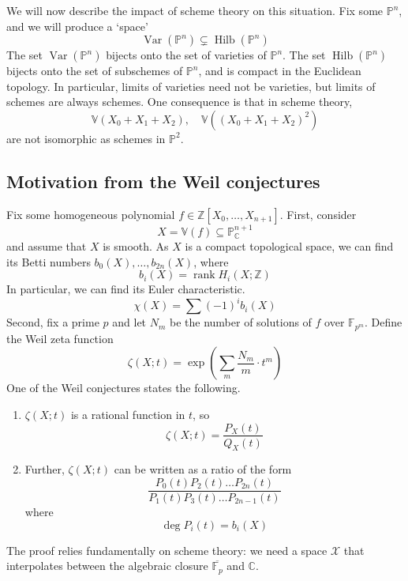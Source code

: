 We will now describe the impact of scheme theory on this situation.
Fix some \( \mathbb P^n \), and we will produce a `space'
\[ \operatorname{Var}(\mathbb P^n) \subsetneq \operatorname{Hilb}(\mathbb P^n) \]
The set \( \operatorname{Var}(\mathbb P^n) \) bijects onto the set of varieties of \( \mathbb P^n \).
The set \( \operatorname{Hilb}(\mathbb P^n) \) bijects onto the set of subschemes of \( \mathbb P^n \), and is compact in the Euclidean topology.
In particular, limits of varieties need not be varieties, but limits of schemes are always schemes.
One consequence is that in scheme theory,
\[ \mathbb V(X_0 + X_1 + X_2),\quad \mathbb V((X_0 + X_1 + X_2)^2) \]
are not isomorphic as schemes in \( \mathbb P^2 \).

\subsection{Motivation from the Weil conjectures}
Fix some homogeneous polynomial \( f \in \mathbb Z[X_0, \dots, X_{n+1}] \).
First, consider
\[ X = \mathbb V(f) \subseteq \mathbb P^{n+1}_{\mathbb C} \]
and assume that \( X \) is smooth.
As \( X \) is a compact topological space, we can find its Betti numbers \( b_0(X), \dots, b_{2n}(X) \), where
\[ b_i(X) = \operatorname{rank} H_i(X; \mathbb Z) \]
In particular, we can find its Euler characteristic.
\[ \chi(X) = \sum (-1)^i b_i(X) \]
Second, fix a prime \( p \) and let \( N_m \) be the number of solutions of \( f \) over \( \mathbb F_{p^m} \).
Define the Weil zeta function
\[ \zeta(X;t) = \exp(\sum_m \frac{N_m}{m} \cdot t^m) \]
One of the Weil conjectures states the following.
\begin{theorem}[Grothendieck]
    \begin{enumerate}
        \item \( \zeta(X; t) \) is a rational function in \( t \), so
        \[ \zeta(X; t) = \frac{P_X(t)}{Q_X(t)} \]
        \item Further, \( \zeta(X; t) \) can be written as a ratio of the form
        \[ \frac{P_0(t) P_2(t) \dots P_{2n}(t)}{P_1(t) P_3(t) \dots P_{2n-1}(t)} \]
        where
        \[ \deg P_i(t) = b_i(X) \]
    \end{enumerate}
\end{theorem}
The proof relies fundamentally on scheme theory: we need a space \( \mathcal X \) that interpolates between the algebraic closure \( \overline{\mathbb F_p} \) and \( \mathbb C \).
